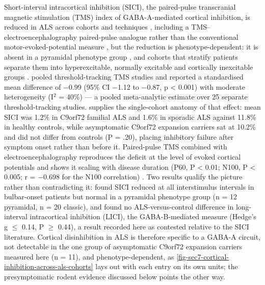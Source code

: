\documentclass[11pt]{article}
\begin{document}
Short-interval intracortical inhibition (SICI), the paired-pulse transcranial magnetic stimulation (TMS) index of GABA-A-mediated cortical inhibition, is reduced in ALS across cohorts and techniques \citep{Higashihara2024,Geevasinga2015}, including a TMS--electroencephalography paired-pulse analogue rather than the conventional motor-evoked-potential measure \citep{VanDenBos2024}, but the reduction is phenotype-dependent: it is absent in a pyramidal phenotype group \citep{Tankisi2025}, and cohorts that stratify patients separate them into hyperexcitable, normally excitable and cortically inexcitable groups \citep{Pavey2024}. \citet{Higashihara2024} pooled threshold-tracking TMS studies and reported a standardised mean difference of $-$0.99 (95\% CI $-$1.12 to $-$0.87, p < 0.001) with moderate heterogeneity (I$^{2}$ = 40\%) --- a pooled meta-analytic estimate over 25 separate threshold-tracking studies. \citet{Geevasinga2015} supplies the single-cohort anatomy of that effect: mean SICI was 1.2\% in C9orf72 familial ALS and 1.6\% in sporadic ALS against 11.8\% in healthy controls, while asymptomatic C9orf72 expansion carriers sat at 10.2\% and did not differ from controls (P = .20), placing inhibitory failure after symptom onset rather than before it. Paired-pulse TMS combined with electroencephalography reproduces the deficit at the level of evoked cortical potentials and shows it scaling with disease duration (P60, P < 0.01; N100, P < 0.005; r = $-$0.698 for the N100 correlation) \citep{VanDenBos2024}. Two results qualify the picture rather than contradicting it: \citet{Tankisi2025} found SICI reduced at all interstimulus intervals in bulbar-onset patients but normal in a pyramidal phenotype group (n = 12 pyramidal, n = 20 classic), and \citet{McMackin2026} found no ALS-versus-control difference in long-interval intracortical inhibition (LICI), the GABA-B-mediated measure (Hedge's g $\leq$ 0.14, P $\geq$ 0.44), a result recorded here as contested relative to the SICI literature. Cortical disinhibition in ALS is therefore specific to a GABA-A circuit, not detectable in the one group of asymptomatic C9orf72 expansion carriers measured here (n = 11), and phenotype-dependent, as \ref{fig-sec7-cortical-inhibition-across-als-cohorts} lays out with each entry on its own units; the presymptomatic rodent evidence discussed below points the other way.
\end{document}
